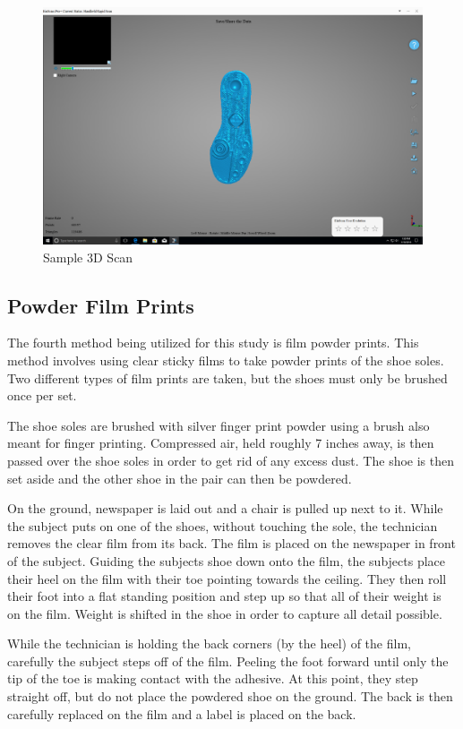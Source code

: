 \begin{figure}[!htp]
\centering
\includegraphics[width=12cm]{3D_Adidas_2}
\caption{Sample 3D Scan}
\label{Image 12}
\end{figure}


\subsection{Powder Film Prints}

   The fourth method being utilized for this study is film powder prints. This method involves using clear sticky films to take powder prints of the shoe soles. Two different types of film prints are taken, but the shoes must only be brushed once per set. 
   
   The shoe soles are brushed with silver finger print powder using a brush also meant for finger printing. Compressed air, held roughly 7 inches away, is then passed over the shoe soles in order to get rid of any excess dust. The shoe is then set aside and the other shoe in the pair can then be powdered. 
   
   On the ground, newspaper is laid out and a chair is pulled up next to it. While the subject puts on one of the shoes, without touching the sole, the technician removes the clear film from its back. The film is placed on the newspaper in front of the subject. Guiding the subjects shoe down onto the film, the subjects place their heel on the film with their toe pointing towards the ceiling. They then roll their foot into a flat standing position and step up so that all of their weight is on the film. Weight is shifted in the shoe in order to capture all detail possible. 

   While the technician is holding the back corners (by the heel) of the film, carefully the subject steps off of the film. Peeling the foot forward until only the tip of the toe is making contact with the adhesive. At this point, they step straight off, but do not place the powdered shoe on the ground. The back is then carefully replaced on the film and a label is placed on the back. 


